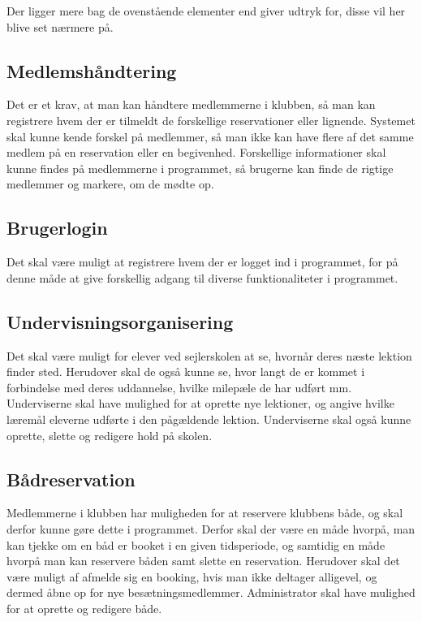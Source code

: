 Der ligger mere bag de ovenstående elementer end  giver udtryk for, disse vil her blive set nærmere på.

\subsection{Medlemshåndtering} 

Det er et krav, at man kan håndtere medlemmerne i klubben, så man kan registrere hvem der er tilmeldt de forskellige reservationer eller lignende.
Systemet skal kunne kende forskel på medlemmer, så man ikke kan have flere af det samme medlem på en reservation eller en begivenhed.
Forskellige informationer skal kunne findes på medlemmerne i programmet, så brugerne kan finde de rigtige medlemmer og markere, om de mødte op.

\subsection{Brugerlogin}
Det skal være muligt at registrere hvem der er logget ind i programmet, for på denne måde at give forskellig adgang til diverse funktionaliteter i programmet.

\subsection{Undervisningsorganisering}

Det skal være muligt for elever ved sejlerskolen at se, hvornår deres næste lektion finder sted.
Herudover skal de også kunne se, hvor langt de er kommet i forbindelse med deres uddannelse, hvilke milepæle de har udført mm.
Underviserne skal have mulighed for at oprette nye lektioner, og angive hvilke læremål eleverne udførte i den pågældende lektion. 
Underviserne skal også kunne oprette, slette og redigere hold på skolen. 

\subsection{Bådreservation}

Medlemmerne i klubben har muligheden for at reservere klubbens både, og skal derfor kunne gøre dette i programmet.
Derfor skal der være en måde hvorpå, man kan tjekke om en båd er booket i en given tidsperiode, og samtidig en måde hvorpå man kan reservere båden samt slette en reservation.
Herudover skal det være muligt af afmelde sig en booking, hvis man ikke deltager alligevel, og dermed åbne op for nye besætningsmedlemmer.
Administrator skal have mulighed for at oprette og redigere både.

